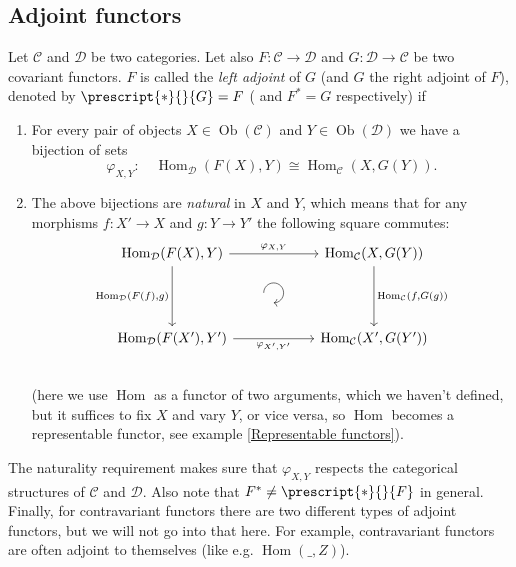 \documentclass[english,letterpaper]{article}%
\numberwithin{equation}{section}
\numberwithin{figure}{section}
\numberwithin{table}{section}
\theoremstyle{definition}
\theoremstyle{definition}
\theoremstyle{definition}
\theoremstyle{plain}
\theoremstyle{plain}
\theoremstyle{plain}
\theoremstyle{plain}
\theoremstyle{remark}
\theoremstyle{remark}
\DeclareMathOperator{\ob}{Ob}
\DeclareMathOperator{\Hom}{Hom}
\begin{document}
\subsection{Adjoint functors}
\begin{defn}
Let $\mathcal{C}$ and $\mathcal{D}$ be two categories. Let also
$F:\mathcal{C}\to\mathcal{D}$ and $G:\mathcal{D}\to\mathcal{C}$
be two covariant functors. $F$ is called the \emph{left adjoint}
of $G$ (and $G$ the right adjoint of $F$), denoted by $\prescript{\ast}{}{G}=F$
( and $F^{\ast}=G$ respectively) if 
\begin{enumerate}
\item For every pair of objects $X\in\ob\left(\mathcal{C}\right)$ and $Y\in\ob\left(\mathcal{D}\right)$
we have a bijection of sets
\[
\varphi_{X,Y}:\quad\Hom_{\mathcal{D}}\left(F(X),Y\right)\cong\Hom_{\mathcal{C}}\left(X,G(Y)\right).
\]
\item The above bijections are \emph{natural} in $X$ and $Y$, which
means that for any morphisms $f:X'\to X$ and $g:Y\to Y'$ the following
square commutes:\[\begin{tikzcd}[every matrix/.append style={name=m},   
execute at end picture={\draw [<-] ([xshift=0mm,yshift=-3mm]m-2-2.north) arc[start angle=-90,delta angle=270,radius=0.25cm];}]
   \Hom_\mathcal{D}(F(X),Y)\arrow[rr,"\varphi_{X,Y}"]\arrow[dd,swap,"{\Hom_\mathcal{D}(F(f),g)}" ]& & \Hom_\mathcal{C}(X,G(Y)) \arrow[dd,"{\Hom_\mathcal{C}(f,G(g))}"] \\
   & \, & \\
   \Hom_\mathcal{D}(F(X'),Y')\arrow[rr,swap,"\varphi_{X',Y'}" ]& & \Hom_\mathcal{C}(X',G(Y'))\\
\end{tikzcd}\](here we use $\Hom$ as a functor of two arguments, which we haven't
defined, but it suffices to fix $X$ and vary $Y$, or vice versa,
so $\Hom$ becomes a representable functor, see example \ref{Representable functors}).
\end{enumerate}
The naturality requirement makes sure that $\varphi_{X,Y}$ respects
the categorical structures of $\mathcal{C}$ and $\mathcal{D}$. Also
note that $F^{\ast}\neq\prescript{\ast}{}{F}$ in general. Finally, for contravariant
functors there are two different types of adjoint functors, but we
will not go into that here. For example, contravariant functors are
often adjoint to themselves (like e.g. $\Hom\left(\_,Z\right)$).
\end{defn}
\end{document}
